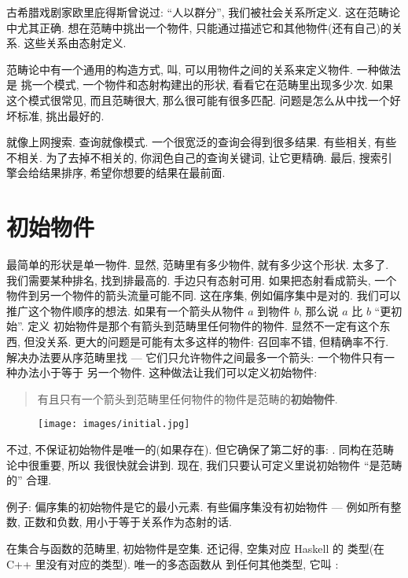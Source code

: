 
\lettrine[lhang=0.17]{古} 希腊戏剧家欧里庇得斯曾说过: ``人以群分'', 我们被社会关系所定义.
这在范畴论中尤其正确. 想在范畴中挑出一个物件, 只能通过描述它和其他物件(还有自己)的关系.
这些关系由态射定义.

范畴论中有一个通用的构造方式, 叫, 可以用物件之间的关系来定义物件. 一种做法是
挑一个模式, 一个物件和态射构建出的形状, 看看它在范畴里出现多少次. 如果这个模式很常见, 而且范畴很大,
那么很可能有很多匹配. 问题是怎么从中找一个好坏标准, 挑出最好的.

就像上网搜索. 查询就像模式. 一个很宽泛的查询会得到很多结果. 有些相关, 有些不相关. 为了去掉不相关的,
你润色自己的查询关键词, 让它更精确. 最后, 搜索引擎会给结果排序, 希望你想要的结果在最前面.

\section{初始物件}

最简单的形状是单一物件. 显然, 范畴里有多少物件, 就有多少这个形状. 太多了. 我们需要某种排名, 找到排最高的.
手边只有态射可用. 如果把态射看成箭头, 一个物件到另一个物件的箭头流量可能不同. 这在序集, 例如偏序集中是对的.
我们可以推广这个物件顺序的想法. 如果有一个箭头从物件 $a$ 到物件 $b$, 那么说 $a$ 比 $b$ ``更初始''. 定义
初始物件是那个有箭头到范畴里任何物件的物件. 显然不一定有这个东西, 但没关系. 更大的问题是可能有太多这样的物件:
召回率不错, 但精确率不行. 解决办法要从序范畴里找 --- 它们只允许物件之间最多一个箭头: 一个物件只有一种办法小于等于
另一个物件. 这种做法让我们可以定义初始物件:

\begin{quote}
  有且只有一个箭头到范畴里任何物件的物件是范畴的\textbf{初始物件}.
\end{quote}

\begin{figure}[H]
  \centering
  \texttt{[image: images/initial.jpg]}
\end{figure}

\noindent
不过, 不保证初始物件是唯一的(如果存在). 但它确保了第二好的事: . 同构在范畴论中很重要, 所以
我很快就会讲到. 现在, 我们只要认可定义里说初始物件 ``是范畴的'' 合理.

例子: 偏序集的初始物件是它的最小元素. 有些偏序集没有初始物件 --- 例如所有整数, 正数和负数, 用小于等于关系作为态射的话.

在集合与函数的范畴里, 初始物件是空集. 还记得, 空集对应 Haskell 的  类型(在 C++ 里没有对应的类型).
唯一的多态函数从  到任何其他类型, 它叫 :

